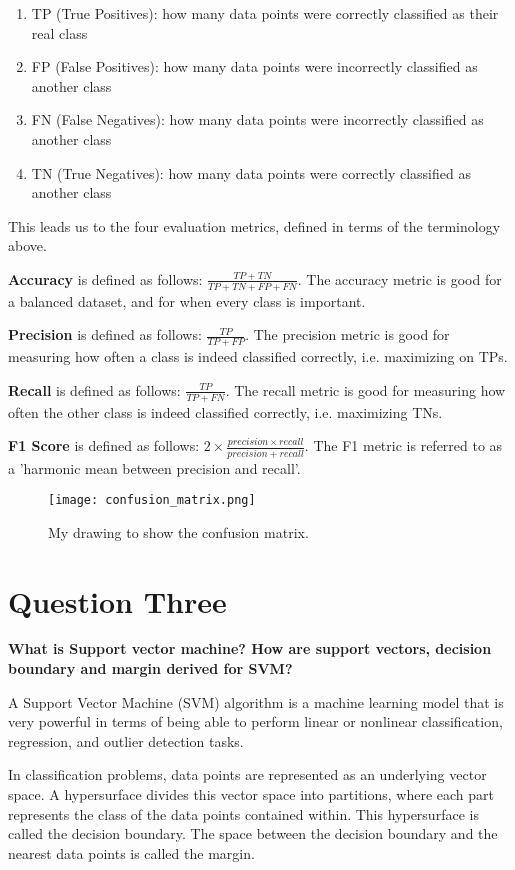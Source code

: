 \documentclass{article}
\begin{document}
\begin{enumerate}
    \item TP (True Positives): how many data points were correctly classified as their real class
    \item FP (False Positives): how many data points were incorrectly classified as another class
    \item FN (False Negatives): how many data points were incorrectly classified as another class
    \item TN (True Negatives): how many data points were correctly classified as another class
\end{enumerate}

This leads us to the four evaluation metrics, defined in terms of the terminology above.

\textbf{Accuracy} is defined as follows: $\frac{TP+TN}{TP+TN+FP+FN}$. The accuracy metric is good for a balanced dataset, and for when every class is important.

\textbf{Precision} is defined as follows: $\frac{TP}{TP+FP}$. The precision metric is good for measuring how often a class is indeed classified correctly, i.e. maximizing on TPs. 

\textbf{Recall} is defined as follows: $\frac{TP}{TP+FN}$. The recall metric is good for measuring how often the other class is indeed classified correctly, i.e. maximizing TNs.

\textbf{F1 Score} is defined as follows: $2\times \frac{precision\times recall}{precision + recall}$. The F1 metric is referred to as a 'harmonic mean between precision and recall'. 

\begin{figure}
    \centering
    \texttt{[image: confusion\_matrix.png]}
    \caption{My drawing to show the confusion matrix.}
    \label{confusion-matrix}
\end{figure}

\section{Question Three}
\noindent \textbf{What is Support vector machine? How are support vectors, decision boundary and margin derived for SVM?}

A Support Vector Machine (SVM) algorithm is a machine learning model that is very powerful in terms of being able to perform linear or nonlinear classification, regression, and outlier detection tasks.

In classification problems, data points are represented as an underlying vector space. A hypersurface divides this vector space into partitions, where each part represents the class of the data points contained within. This hypersurface is called the decision boundary. The space between the decision boundary and the nearest data points is called the margin.
\end{document}
